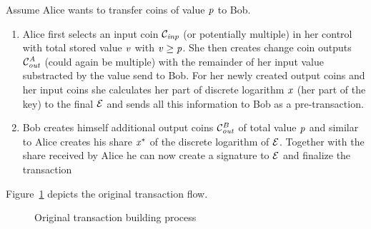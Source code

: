 Assume Alice wants to transfer coins of value $\mathit{p}$ to Bob.
\begin{enumerate}
    \item Alice first selects an input coin $\mathcal{C}_{\mathit{inp}}$ (or potentially multiple) in her control with total stored value $\mathit{v}$ with $\mathit{v} \geq \mathit{p}$.
    She then creates change coin outputs $\mathcal{C}_{\mathit{out}}^{\mathit{A}}$ (could again be multiple) with the remainder of her input value substracted by the value send to Bob.
    For her newly created output coins and her input coins she calculates her part of discrete logarithm $\mathit{x}$ (her part of the key) to the final $\mathcal{E}$ and sends all this information to Bob as a pre-transaction.
    \item Bob creates himself additional output coins $\mathcal{C}_{\mathit{out}}^B$ of total value $\mathit{p}$ and similar to Alice creates his share $\mathit{x}^*$ of the discrete logarithm of $\mathcal{E}$.
    Together with the share received by Alice he can now create a signature to $\mathcal{E}$ and finalize the transaction
\end{enumerate}
Figure~\ref{fig:txOriginal} depicts the original transaction flow.\\
\begin{figure}
    \centering
    \caption{Original transaction building process\label{fig:txOriginal}}
\end{figure}

